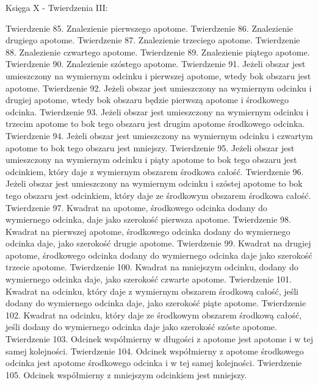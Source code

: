     
    Księga X - Twierdzenia III:
    
    Twierdzenie 85.
        Znalezienie pierwszego apotome.
    Twierdzenie 86.
        Znalezienie drugiego apotome.
    Twierdzenie 87.
        Znalezienie trzeciego apotome.
    Twierdzenie 88.
        Znalezienie czwartego apotome.
    Twierdzenie 89.
        Znalezienie piątego apotome.
    Twierdzenie 90.
        Znalezienie szóstego apotome.
    Twierdzenie 91.
        Jeżeli obszar jest umieszczony na wymiernym odcinku i pierwszej apotome, wtedy bok obszaru jest apotome.
    Twierdzenie 92.
        Jeżeli obszar jest umieszczony na wymiernym odcinku i drugiej apotome, wtedy bok obszaru będzie pierwszą apotome i środkowego odcinka.
    Twierdzenie 93.
        Jeżeli obszar jest umieszczony na wymiernym odcinku i trzecim apotome to bok tego obszaru jest drugim apotome środkowego odcinka.
    Twierdzenie 94.
        Jeżeli obszar jest umieszczony na wymiernym odcinku i czwartym apotome to bok tego obszaru jest mniejszy. 
    Twierdzenie 95.
        Jeżeli obszar jest umieszczony na wymiernym odcinku i piąty apotome to bok tego obszaru jest odcinkiem, który daje z wymiernym obszarem środkowa całość.
    Twierdzenie 96.
        Jeżeli obszar jest umieszczony na wymiernym odcinku i szóstej apotome to bok tego obszaru jest odcinkiem, który daje ze środkowym obszarem środkowa całość.
    Twierdzenie 97.
        Kwadrat na apotome, środkowego odcinka dodany do wymiernego odcinka, daje jako szerokość pierwsza apotome.
    Twierdzenie 98.
        Kwadrat na pierwszej apotome, środkowego odcinka dodany do wymiernego odcinka daje, jako szerokość drugie apotome.
    Twierdzenie 99.
        Kwadrat na drugiej apotome, środkowego odcinka dodany do wymiernego odcinka daje jako szerokość trzecie apotome.
    Twierdzenie 100.
        Kwadrat na mniejszym odcinku, dodany do wymiernego odcinka daje, jako szerokość czwarte apotome.
    Twierdzenie 101.
        Kwadrat na odcinku, który daje z wymiernym obszarem środkową całość, jeśli dodany do wymiernego odcinka daje, jako szerokość piąte apotome.
    Twierdzenie 102.
        Kwadrat na odcinku, który daje ze środkowym obszarem środkową całość, jeśli dodany do wymiernego odcinka daje jako szerokość szóste apotome.
    Twierdzenie 103.
        Odcinek współmierny w długości z apotome jest apotome i w tej samej kolejności.
    Twierdzenie 104.
        Odcinek współmierny z apotome środkowego odcinka jest apotome środkowego odcinka i w tej samej kolejności.
    Twierdzenie 105.
        Odcinek współmierny z mniejszym odcinkiem jest mniejszy.
